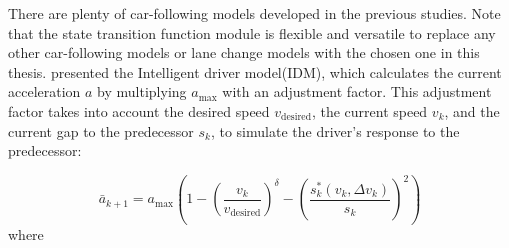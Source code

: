 There are plenty of car-following models developed in the previous studies. Note that the state transition function module is flexible and versatile to replace any other car-following models or lane change models with the chosen one in this thesis. \textcite{treiber2000congested} presented the Intelligent driver model(IDM), which calculates the current acceleration \(a\) by multiplying \(a_{\text{max}}\) with an adjustment factor. This adjustment factor takes into account the desired speed $v_{\text{desired}}$, the current speed $v_k$, and the current gap to the predecessor $s_k$, to simulate the driver's response to the predecessor:

\begin{equation}\label{acceleration update equation 1}
     \bar a_{k+1}  = a_{\text{max}} \left( 1 - \left( \frac{v_k}{v_{\text{desired}}} \right)^\delta - \left( \frac{s_k^*(v_k, \Delta v_k)}{s_k} \right)^2 \right) 
\end{equation}
where
